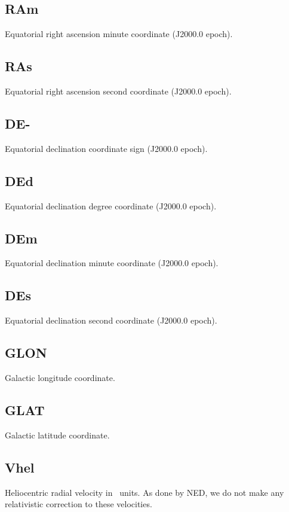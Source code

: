 \subsection{RAm} \label{RAm}
Equatorial right ascension minute coordinate (J2000.0 epoch).

\subsection{RAs} \label{RAs}
Equatorial right ascension second coordinate (J2000.0 epoch).

\subsection{DE-} \label{DE-}
Equatorial declination coordinate sign (J2000.0 epoch).

\subsection{DEd} \label{DEd}
Equatorial declination degree coordinate (J2000.0 epoch).

\subsection{DEm} \label{DEm}
Equatorial declination minute coordinate (J2000.0 epoch).

\subsection{DEs} \label{DEs}
Equatorial declination second coordinate (J2000.0 epoch).

\subsection{GLON} \label{GLON}
Galactic longitude coordinate.

\subsection{GLAT} \label{GLAT}
Galactic latitude coordinate.

\subsection{Vhel} \label{Vhel}
Heliocentric radial velocity in \kms~units. As done by NED, we do not make any relativistic correction to these velocities.

